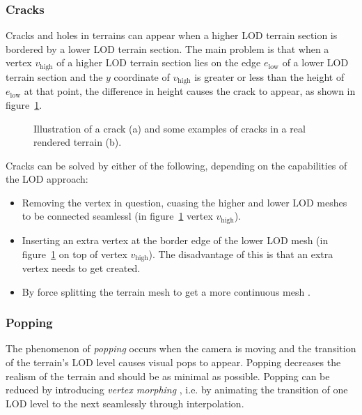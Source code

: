 \subsubsection{Cracks}
Cracks and holes in terrains can appear when a higher LOD terrain section is bordered 
by a lower LOD terrain section. The main problem is that when a vertex $v_{\text{high}}$ of a higher LOD terrain section lies on the edge $e_{\text{low}}$
of a lower LOD terrain section and the $y$ coordinate of $v_{\text{high}}$ is greater or less than the 
height of $e_{\text{low}}$ at that point, the difference in height causes the crack to appear, as shown in figure~\ref{fig:crack-example}.
\begin{figure}[H]
  \centering
  \qquad
  \caption{Illustration of a crack (a) and some examples of cracks in a real rendered terrain (b).}\label{fig:crack-example}
\end{figure}
Cracks can be solved by either of the following, depending on the capabilities of the LOD approach:
\begin{itemize}
  \item Removing the vertex in question, cuasing the higher and lower LOD meshes to be connected seamlessl (in figure~\ref{fig:crack-example} vertex $v_{\text{high}}$).
  \item Inserting an extra vertex at the border edge of the lower LOD mesh \cite[p.~194]{lodfor3dgraphics} (in figure~\ref{fig:crack-example} on top of vertex $v_{\text{high}}$). The disadvantage of this is that an extra vertex needs to get created.
  \item By force splitting the terrain mesh to get a more continuous mesh \cite[p.~193]{lodfor3dgraphics}. 
\end{itemize}

\subsubsection{Popping}
The phenomenon of \textit{popping} occurs when the camera is moving 
and the transition of the terrain's LOD level causes visual pops to appear.
Popping decreases the realism of the terrain and should be as minimal as possible.
Popping can be reduced by introducing \textit{vertex morphing} \cite{geomipmapping,geomclipmaps,cdlod}, 
i.e. by animating the transition of one LOD level to the next seamlessly through interpolation.

